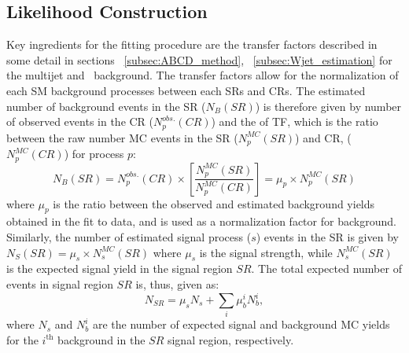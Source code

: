 	\subsection{Likelihood Construction}
	Key ingredients for the fitting procedure are the transfer factors described in some detail in sections ~\ref{subsec:ABCD_method}, ~\ref{subsec:Wjet_estimation} for the multijet and \Wjets\ background. 
	The transfer factors allow for the normalization of each \ac{SM} background processes between each \acp{SR} and \acp{CR}. 
	The estimated number of background events in the \ac{SR} ($N_B(SR)$) is therefore given by number of observed events in the \ac{CR} ($N_p^{obs.}(CR)$) and the of \ac{TF}, which is the ratio between the raw number \ac{MC} events in the \ac{SR} ($N_p^{MC}(SR)$) and \ac{CR}, ($N_p^{MC}(CR)$) for process $p$:
	\begin{equation}
	N_B(SR)=N_p^{obs.}(CR)\times\left[ \frac{N_p^{MC}(SR)}{N_p^{MC}(CR)} \right]=\mu_p \times N_p^{MC}(SR)
	\end{equation}
	 where $\mu_p$ is the ratio between the observed and estimated background yields obtained in the fit to data, and is used as a normalization factor for background. Similarly, the number of estimated signal process ($s$) events in the \ac{SR} is given by $N_S(SR)=\mu_s \times N_s^{MC}(SR)$ where $\mu_s$ is the signal strength, while $N_s^{MC}(SR)$ is the expected signal yield in the signal region $SR$. 
	The total expected number of events in signal region $SR$ is, thus, given as:	
	\begin{equation}
	N_{SR} = \mu_sN_s+\sum_{i}\mu_b^iN_b^i,
	\label{eq:N_SR}
	\end{equation}
	where $N_s$ and $N_b^i$ are the number of expected signal and background \ac{MC} yields for the $i^{\textrm{th}}$ background in the $SR$ signal region, respectively.
